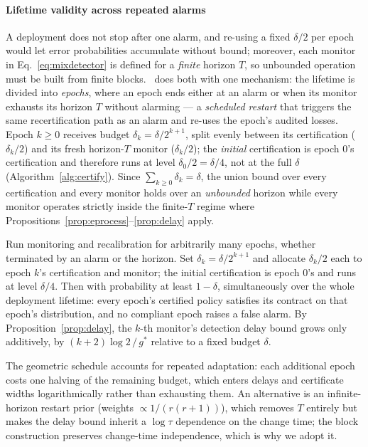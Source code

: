 \paragraph{Lifetime validity across repeated alarms}
A deployment does not stop after one alarm, and re-using a fixed
$\delta/2$ per epoch would let error probabilities accumulate without
bound; moreover, each monitor in Eq.~\eqref{eq:mixdetector} is defined
for a \emph{finite} horizon $T$, so unbounded operation must be built
from finite blocks. \system\ does both with one mechanism: the
lifetime is divided into \emph{epochs}, where an epoch ends either at
an alarm or when its monitor exhausts its horizon $T$ without alarming
--- a \emph{scheduled restart} that triggers the same recertification
path as an alarm and re-uses the epoch's audited losses. Epoch
$k \ge 0$ receives budget
$\delta_k = \delta/2^{k+1}$, split evenly between its certification
($\delta_k/2$) and its fresh horizon-$T$ monitor ($\delta_k/2$); the
\emph{initial} certification is epoch 0's certification and therefore
runs at level $\delta_0/2 = \delta/4$, not at the full $\delta$
(Algorithm~\ref{alg:certify}). Since
$\sum_{k \ge 0} \delta_k = \delta$, the union bound over every
certification and every monitor holds over an
\emph{unbounded} horizon while every monitor operates strictly inside
the finite-$T$ regime where
Propositions~\ref{prop:eprocess}--\ref{prop:delay} apply.

\begin{proposition}
\label{prop:lifetime}
Run monitoring and recalibration for arbitrarily many epochs, whether
terminated by an alarm or the horizon. Set
$\delta_k=\delta/2^{k+1}$ and allocate $\delta_k/2$ each to epoch $k$'s
certification and monitor; the initial certification is epoch 0's and
runs at level $\delta/4$. Then with probability
at least $1-\delta$, simultaneously over the whole deployment
lifetime: every epoch's certified policy satisfies its contract on
that epoch's distribution, and no compliant epoch raises a false
alarm. By Proposition~\ref{prop:delay}, the $k$-th monitor's detection
delay bound grows only additively, by $(k+2)\log 2 \,/\, g^\ast$
relative to a fixed budget $\delta$.
\end{proposition}

The geometric schedule accounts for repeated adaptation: each
additional epoch costs one halving of the remaining budget, which
enters delays and certificate widths logarithmically rather than
exhausting them. An alternative is an
infinite-horizon restart prior (weights $\propto 1/(r(r+1))$), which
removes $T$ entirely but makes the delay bound inherit a $\log\tau$
dependence on the change time; the block construction preserves
change-time independence, which is why we adopt it.

